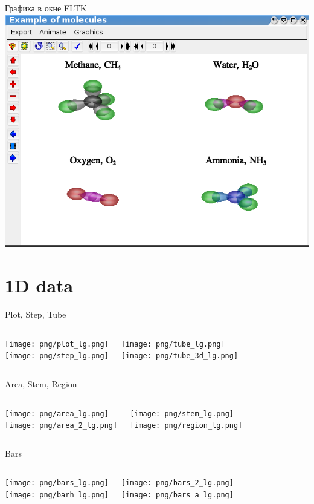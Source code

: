 \documentclass[color=usenames]{beamer}
\begin{document}
\begin{frame}{Графика в окне FLTK}
\includegraphics[width = 0.9 \textwidth]{fltk.png}
\end{frame}


\section{1D data}

\begin{frame}{Plot, Step, Tube}
\begin{columns}
\texttt{[image: png/plot\_lg.png]}\\
\texttt{[image: png/step\_lg.png]}

\texttt{[image: png/tube\_lg.png]}\\
\texttt{[image: png/tube\_3d\_lg.png]}

\end{columns}
\end{frame}

\begin{frame}{Area, Stem, Region}
\begin{columns}
\texttt{[image: png/area\_lg.png]}\\
\texttt{[image: png/area\_2\_lg.png]}

\texttt{[image: png/stem\_lg.png]}\\
\texttt{[image: png/region\_lg.png]}

\end{columns}
\end{frame}

\begin{frame}{Bars}
\begin{columns}
\texttt{[image: png/bars\_lg.png]}\\
\texttt{[image: png/barh\_lg.png]}

\texttt{[image: png/bars\_2\_lg.png]}\\
\texttt{[image: png/bars\_a\_lg.png]}

\end{columns}
\end{frame}
\end{document}
